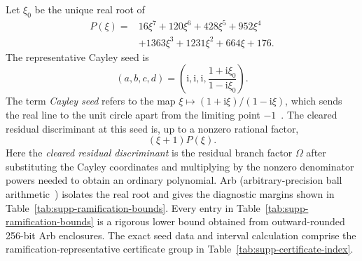 \documentclass[aps,prx,reprint,nofootinbib,twoside,superscriptaddress,longbibliography,floatfix]{revtex4-2}
\theoremstyle{definition}
\newcommand{\I}{\mathrm i}
\begin{document}
{Let $\xi_0$ be the unique real root of}
\begin{equation}
\begin{aligned}
P(\xi)={}&16\xi^7+120\xi^6+428\xi^5+952\xi^4\\
&+1363\xi^3+1231\xi^2+664\xi+176.
\end{aligned}
\label{eq:supp-ramification-polynomial}
\end{equation}
{The representative Cayley seed is}
\begin{equation}
{(a,b,c,d)=\left(\I,\I,\I,\frac{1+\I\xi_0}{1-\I\xi_0}\right).}
\label{eq:supp-ramification-seed}
\end{equation}
{The term \emph{Cayley seed} refers to the map $\xi\mapsto(1+\I\xi)/(1-\I\xi)$, which sends the real line to the unit circle apart from the limiting point $-1$~\cite{Cayley1846}. The cleared residual discriminant at this seed is, up to a nonzero rational factor,}
\begin{equation}
(\xi+1)P(\xi).
\label{eq:supp-ramification-specialization}
\end{equation}
Here the \emph{cleared residual discriminant} is the residual branch factor $\Omega$ after substituting the Cayley coordinates and multiplying by the nonzero denominator powers needed to obtain an ordinary polynomial. Arb (arbitrary-precision ball arithmetic~\cite{Johansson2017Arb}) isolates the real root and gives the diagnostic margins shown in Table~\ref{tab:supp-ramification-bounds}.
{Every entry in Table~\ref{tab:supp-ramification-bounds} is a rigorous lower bound obtained from outward-rounded 256-bit Arb enclosures. The exact seed data and interval calculation comprise the ramification-representative certificate group in Table~\ref{tab:supp-certificate-index}.}
\end{document}
